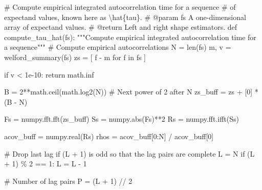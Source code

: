 \documentclass[
  letterpaper,
  DIV=11,
  numbers=noendperiod]{scrartcl}
\newenvironment{Shaded}{\begin{snugshade}}{\end{snugshade}}
\newcommand{\BuiltInTok}[1]{\textcolor[rgb]{0.00,0.23,0.31}{#1}}
\newcommand{\CommentTok}[1]{\textcolor[rgb]{0.37,0.37,0.37}{#1}}
\newcommand{\ControlFlowTok}[1]{\textcolor[rgb]{0.00,0.23,0.31}{#1}}
\newcommand{\DecValTok}[1]{\textcolor[rgb]{0.68,0.00,0.00}{#1}}
\newcommand{\FloatTok}[1]{\textcolor[rgb]{0.68,0.00,0.00}{#1}}
\newcommand{\KeywordTok}[1]{\textcolor[rgb]{0.00,0.23,0.31}{#1}}
\newcommand{\NormalTok}[1]{\textcolor[rgb]{0.00,0.23,0.31}{#1}}
\newcommand{\OperatorTok}[1]{\textcolor[rgb]{0.37,0.37,0.37}{#1}}
\begin{document}
\begin{Shaded}
\begin{Highlighting}[]
\CommentTok{\# Compute empirical integrated autocorrelation time for a sequence}
\CommentTok{\# of expectand values, known here as \textbackslash{}hat\{tau\}.}
\CommentTok{\# @param fs A one{-}dimensional array of expectand values.}
\CommentTok{\# @return Left and right shape estimators.}
\KeywordTok{def}\NormalTok{ compute\_tau\_hat(fs):}
  \CommentTok{"""Compute empirical integrated autocorrelation time for a sequence"""}
  \CommentTok{\# Compute empirical autocorrelations}
\NormalTok{  N }\OperatorTok{=} \BuiltInTok{len}\NormalTok{(fs)}
\NormalTok{  m, v }\OperatorTok{=}\NormalTok{ welford\_summary(fs)}
\NormalTok{  zs }\OperatorTok{=}\NormalTok{ [ f }\OperatorTok{{-}}\NormalTok{ m }\ControlFlowTok{for}\NormalTok{ f }\KeywordTok{in}\NormalTok{ fs ]}
  
  \ControlFlowTok{if}\NormalTok{ v }\OperatorTok{\textless{}} \FloatTok{1e{-}10}\NormalTok{:}
    \ControlFlowTok{return}\NormalTok{ math.inf}
  
\NormalTok{  B }\OperatorTok{=} \DecValTok{2}\OperatorTok{**}\NormalTok{math.ceil(math.log2(N)) }\CommentTok{\# Next power of 2 after N}
\NormalTok{  zs\_buff }\OperatorTok{=}\NormalTok{ zs }\OperatorTok{+}\NormalTok{ [}\DecValTok{0}\NormalTok{] }\OperatorTok{*}\NormalTok{ (B }\OperatorTok{{-}}\NormalTok{ N)}
  
\NormalTok{  Fs }\OperatorTok{=}\NormalTok{ numpy.fft.fft(zs\_buff)}
\NormalTok{  Ss }\OperatorTok{=}\NormalTok{ numpy.}\BuiltInTok{abs}\NormalTok{(Fs)}\OperatorTok{**}\DecValTok{2}
\NormalTok{  Rs }\OperatorTok{=}\NormalTok{ numpy.fft.ifft(Ss)}

\NormalTok{  acov\_buff }\OperatorTok{=}\NormalTok{ numpy.real(Rs)}
\NormalTok{  rhos }\OperatorTok{=}\NormalTok{ acov\_buff[}\DecValTok{0}\NormalTok{:N] }\OperatorTok{/}\NormalTok{ acov\_buff[}\DecValTok{0}\NormalTok{]}
  
  \CommentTok{\# Drop last lag if (L + 1) is odd so that the lag pairs are complete}
\NormalTok{  L }\OperatorTok{=}\NormalTok{ N}
  \ControlFlowTok{if}\NormalTok{ (L }\OperatorTok{+} \DecValTok{1}\NormalTok{) }\OperatorTok{\%} \DecValTok{2} \OperatorTok{==} \DecValTok{1}\NormalTok{:}
\NormalTok{    L }\OperatorTok{=}\NormalTok{ L }\OperatorTok{{-}} \DecValTok{1}
  
  \CommentTok{\# Number of lag pairs}
\NormalTok{  P }\OperatorTok{=}\NormalTok{ (L }\OperatorTok{+} \DecValTok{1}\NormalTok{) }\OperatorTok{//} \DecValTok{2}
  

\end{Highlighting}
\end{Shaded}
\end{document}
